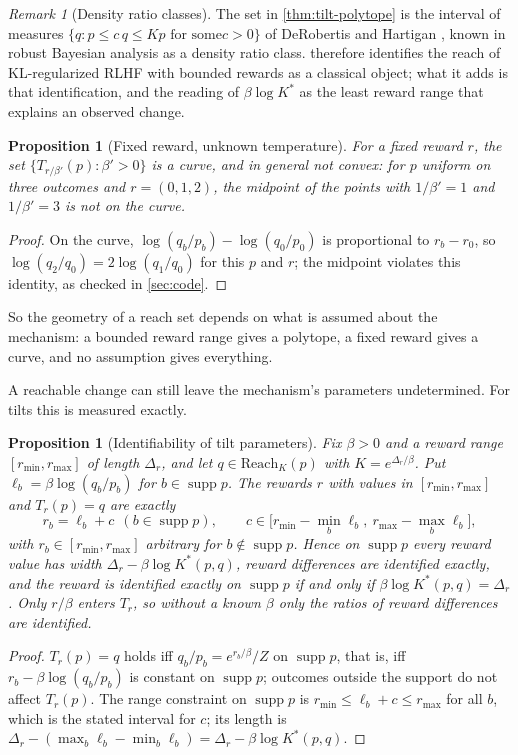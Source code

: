 \documentclass[11pt]{article}
\newtheorem{proposition}[theorem]{Proposition}
\theoremstyle{definition}
\theoremstyle{remark}
\newtheorem{remark}[theorem]{Remark}
\newcommand{\Reach}{\mathrm{Reach}}
\newcommand{\supp}{\operatorname{supp}}
\begin{document}
\begin{remark}[Density ratio classes]\label{rem:drc}
The set in \cref{thm:tilt-polytope} is the interval of measures $\{q: p\le c\,q\le Kp\text{ for some
}c>0\}$ of DeRobertis and Hartigan \cite{DeRobertisHartigan1981}, known in robust Bayesian analysis as a
density ratio class.  therefore identifies the reach of KL-regularized RLHF
with bounded rewards as a classical object; what it adds is that identification, and the reading of
$\beta\log K^*$ as the least reward range that explains an observed change.
\end{remark}

\begin{proposition}[Fixed reward, unknown temperature]\label{prop:curve}
For a fixed reward $r$, the set $\{T_{r/\beta'}(p):\beta'>0\}$ is a curve, and in general not convex:
for $p$ uniform on three outcomes and $r=(0,1,2)$, the midpoint of the points with $1/\beta'=1$ and
$1/\beta'=3$ is not on the curve.
\end{proposition}
\begin{proof}
On the curve, $\log(q_b/p_b)-\log(q_0/p_0)$ is proportional to $r_b-r_0$, so $\log(q_2/q_0)=
2\log(q_1/q_0)$ for this $p$ and $r$; the midpoint violates this identity, as checked in
\cref{sec:code}.
\end{proof}

So the geometry of a reach set depends on what is assumed about the mechanism: a bounded reward range
gives a polytope, a fixed reward gives a curve, and no assumption gives everything.

A reachable change can still leave the mechanism's parameters undetermined. For tilts this is
measured exactly.

\begin{proposition}[Identifiability of tilt parameters]\label{prop:reward-ident}
Fix $\beta>0$ and a reward range $[r_{\min},r_{\max}]$ of length $\Delta_r$, and let $q\in\Reach_K(p)$
with $K=e^{\Delta_r/\beta}$. Put $\ell_b=\beta\log(q_b/p_b)$ for $b\in\supp p$. The rewards $r$ with values
in $[r_{\min},r_{\max}]$ and $T_r(p)=q$ are exactly
\[
r_b=\ell_b+c\ \ (b\in\supp p),\qquad c\in\big[r_{\min}-\min_b\ell_b,\ r_{\max}-\max_b\ell_b\big],
\]
with $r_b\in[r_{\min},r_{\max}]$ arbitrary for $b\notin\supp p$.
Hence on $\supp p$ every reward value has width $\Delta_r-\beta\log K^*(p,q)$, reward differences are
identified exactly, and the reward is identified exactly on $\supp p$ if and only if
$\beta\log K^*(p,q)=\Delta_r$. Only $r/\beta$ enters $T_r$, so without a known $\beta$ only the ratios
of reward differences are identified.
\end{proposition}
\begin{proof}
$T_r(p)=q$ holds iff $q_b/p_b=e^{r_b/\beta}/Z$ on $\supp p$, that is, iff $r_b-\beta\log(q_b/p_b)$ is
constant on $\supp p$; outcomes outside the support do not affect $T_r(p)$. The range constraint on
$\supp p$ is $r_{\min}\le\ell_b+c\le r_{\max}$ for all $b$, which is the stated interval for $c$; its
length is $\Delta_r-(\max_b\ell_b-\min_b\ell_b)=\Delta_r-\beta\log K^*(p,q)$.
\end{proof}
\end{document}
